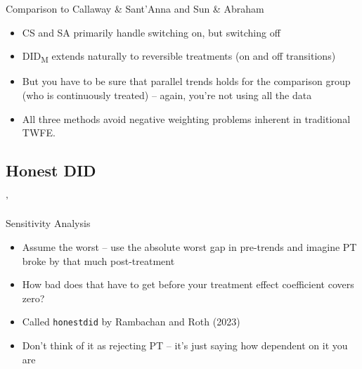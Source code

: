 \documentclass{beamer}
\begin{document}
\begin{frame}{Comparison to Callaway \& Sant'Anna and Sun \& Abraham}
\begin{itemize}
\item CS and SA primarily handle switching on, but switching off
\item DID\textsubscript{M} extends naturally to reversible treatments (on and off transitions)
\item But you have to be sure that parallel trends holds for the comparison group (who is continuously treated) -- again, you're not using all the data
\item All three methods avoid negative weighting problems inherent in traditional TWFE.
\end{itemize}
\end{frame}




\subsection{Honest DID}
'
\begin{frame}{Sensitivity Analysis}

\begin{itemize}
\item Assume the worst -- use the absolute worst gap in pre-trends and imagine PT broke by that much post-treatment
\item How bad does that have to get before your treatment effect coefficient covers zero?
\item Called \texttt{honestdid} by Rambachan and Roth (2023) 
\item Don't think of it as rejecting PT -- it's just saying how dependent on it you are
\end{itemize}

\end{frame}
\end{document}
